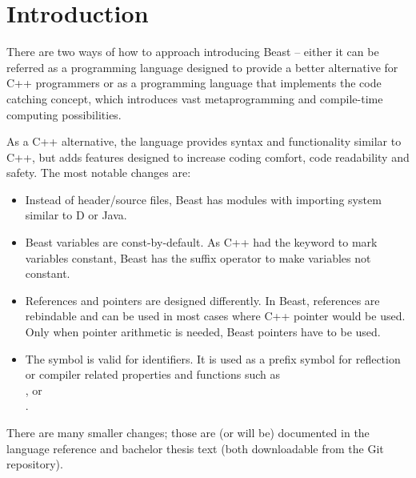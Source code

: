 \documentclass{ExcelAtFIT}
\affiliation{*%
  \href{mailto: xcejch00@stud.fit.vutbr.cz}{xcejch00@stud.fit.vutbr.cz},
  \textit{Faculty of Information Technology, Brno University of Technology}}
\begin{document}
\startdocument



\section{Introduction}

There are two ways of how to approach introducing Beast -- either it can be referred as a programming language designed to provide a better alternative for C++ programmers or as a programming language that implements the code catching concept, which introduces vast metaprogramming and compile-time computing possibilities.

As a C++ alternative, the language provides syntax and functionality similar to C++, but adds features designed to increase coding comfort, code readability and safety. The most notable changes are:
\begin{itemize}
	\item Instead of header/source files, Beast has modules with importing system similar to D or Java.
	\item Beast variables are const-by-default. As C++ had the  keyword to mark variables constant, Beast has the  suffix operator to make variables not constant.
	\item References and pointers are designed differently. In Beast, references are rebindable and can be used in most cases where C++ pointer would be used. Only when pointer arithmetic is needed, Beast pointers have to be used.
	\item The \inlineCode{#} symbol is valid for identifiers. It is used as a prefix symbol for reflection or compiler related properties and functions such as \\,  or \\.
\end{itemize}

There are many smaller changes; those are (or will be) documented in the language reference and bachelor thesis text (both downloadable from the Git repository).
\end{document}
